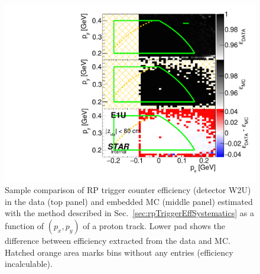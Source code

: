 \begin{figure}[h]%
	\centering
	\parbox{0.4725\textwidth}{
		\centering
		\includegraphics[width=\linewidth,page=6]{graphics/systematicsEfficiency/RpSyst/relativeTriggerEff2D_pxpy.pdf}%
	}
	\quad
	\parbox{0.4725\textwidth}{
		\centering\vspace*{-100pt}
		\caption[Coparison of estimated RP trigger counter efficiency in 2D (detector W2U).]%
    {Sample comparison of RP trigger counter efficiency (detector W2U) in the data (top panel) and embedded MC (middle panel) estimated with the method described in Sec.~\ref{sec:rpTriggerEffSystematics} as a function of $(p_{x},p_{y})$ of a proton track. Lower pad shows the difference between efficiency extracted from the data and MC. Hatched orange area marks bins without any entries (efficiency incalculable).%
    }
	}
	\label{fig:relativeRpRecoEff_W2U}
\end{figure}




